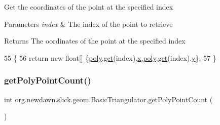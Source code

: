 Get the coordinates of the point at the specified index


\begin{DoxyParams}{Parameters}
{\em index} & The index of the point to retrieve \\
\hline
\end{DoxyParams}
\begin{DoxyReturn}{Returns}
The oordinates of the point at the specified index 
\end{DoxyReturn}

\begin{DoxyCode}
55                                            \{
56         \textcolor{keywordflow}{return} \textcolor{keyword}{new} \textcolor{keywordtype}{float}[] \{\mbox{\hyperlink{classorg_1_1newdawn_1_1slick_1_1geom_1_1_basic_triangulator_ae57823930e5e5413052560e8c85eb92a}{poly}}.\mbox{\hyperlink{classorg_1_1newdawn_1_1slick_1_1geom_1_1_basic_triangulator_1_1_point_list_ae1c25c4d9e9a4064036b06328cb14b2d}{get}}(index).\mbox{\hyperlink{classorg_1_1newdawn_1_1slick_1_1geom_1_1_basic_triangulator_1_1_point_a430d2074970ce9d8248e998f45e0deac}{x}},\mbox{\hyperlink{classorg_1_1newdawn_1_1slick_1_1geom_1_1_basic_triangulator_ae57823930e5e5413052560e8c85eb92a}{poly}}.\mbox{\hyperlink{classorg_1_1newdawn_1_1slick_1_1geom_1_1_basic_triangulator_1_1_point_list_ae1c25c4d9e9a4064036b06328cb14b2d}{get}}(index).\mbox{\hyperlink{classorg_1_1newdawn_1_1slick_1_1geom_1_1_basic_triangulator_1_1_point_aad601993c7f613bd1e26c48a62a950d7}{y}}\};
57     \}
\end{DoxyCode}
\mbox{\label{classorg_1_1newdawn_1_1slick_1_1geom_1_1_basic_triangulator_adb3cafb83d9c2c6ee8353ec59e4f3365}} 
\subsubsection{\texorpdfstring{get\+Poly\+Point\+Count()}{getPolyPointCount()}}
{\footnotesize\ttfamily int org.\+newdawn.\+slick.\+geom.\+Basic\+Triangulator.\+get\+Poly\+Point\+Count (\begin{DoxyParamCaption}{ }\end{DoxyParamCaption})\hspace{0.3cm}{\ttfamily [inline]}}

